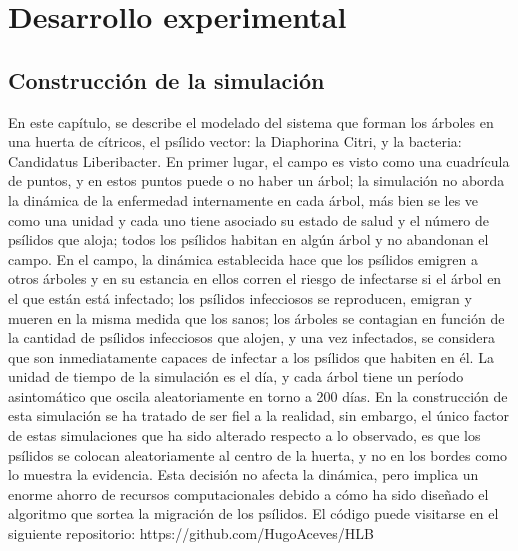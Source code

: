 \chapter{Desarrollo experimental}
\section{Construcción de la simulación}
En este capítulo, se describe el modelado del sistema que forman los árboles en una huerta de cítricos, el psílido vector: la Diaphorina Citri, y la bacteria: Candidatus Liberibacter. En primer lugar, el campo es visto como una cuadrícula de puntos, y en estos puntos puede o no haber un árbol; la simulación no aborda la dinámica de la enfermedad internamente en cada árbol, más bien se les ve como una unidad y cada uno tiene asociado su estado de salud y el número de psílidos que aloja; todos los psílidos   habitan en algún árbol y no abandonan el campo. En el campo, la dinámica establecida hace que los psílidos emigren a otros árboles y en su estancia en ellos corren el riesgo de infectarse si el árbol en el que están está infectado; los psílidos infecciosos se reproducen, emigran y mueren en la misma medida que los sanos; los árboles se contagian en función de la cantidad de psílidos infecciosos que alojen, y una vez infectados, se considera que son inmediatamente capaces de infectar a los psílidos que habiten en él. La unidad de tiempo de la simulación es el día, y cada árbol tiene un período asintomático que oscila aleatoriamente en torno a 200 días.
En la construcción de esta simulación se ha tratado de ser fiel a la realidad, sin embargo, el único factor de estas simulaciones que ha sido alterado respecto a lo observado, es que los psílidos se colocan aleatoriamente al centro de la huerta, y no en los bordes como lo muestra la evidencia. Esta decisión no afecta la dinámica, pero implica un enorme ahorro de recursos computacionales debido a cómo ha sido diseñado el algoritmo que sortea la migración de los psílidos.
El código puede visitarse en el siguiente repositorio:
https://github.com/HugoAceves/HLB

